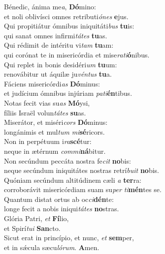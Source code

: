 \evenverse Bénedic, ánima me\textit{a}, \textbf{Dó}mino:~\*\\
\evenverse et noli oblivísci omnes retributi\textit{ó}\textit{nes} \textbf{e}jus.\\
\oddverse Qui propitiátur ómnibus iniquitáti\textit{bus} \textbf{tu}is:~\*\\
\oddverse qui sanat omnes infirmi\textit{tá}\textit{tes} \textbf{tu}as.\\
\evenverse Qui rédimit de intéritu vi\textit{tam} \textbf{tu}am:~\*\\
\evenverse qui corónat te in misericórdia et mise\textit{ra}\textit{ti}\textbf{ó}nibus.\\
\oddverse Qui replet in bonis desidéri\textit{um} \textbf{tu}um:~\*\\
\oddverse renovábitur ut áquilæ ju\textit{vén}\textit{tus} \textbf{tu}a.\\
\evenverse Fáciens misericórdi\textit{as} \textbf{Dó}minus:~\*\\
\evenverse et judícium ómnibus injúriam \textit{pa}\textit{ti}\textbf{én}tibus.\\
\oddverse Notas fecit vias su\textit{as} \textbf{Mó}ysi,~\*\\
\oddverse fíliis Israël volun\textit{tá}\textit{tes} \textbf{su}as.\\
\evenverse Miserátor, et miséri\textit{cors} \textbf{Dó}minus:~\*\\
\evenverse longánimis et mul\textit{tum} \textit{mi}\textbf{sé}ricors.\\
\oddverse Non in perpétuum i\textit{ra}\textbf{scé}tur:~\*\\
\oddverse neque in ætérnum \textit{com}\textit{mi}\textbf{ná}bitur.\\
\evenverse Non secúndum peccáta nostra fe\textit{cit} \textbf{no}bis:~\*\\
\evenverse neque secúndum iniquitátes nostras retrí\textit{bu}\textit{it} \textbf{no}bis.\\
\oddverse Quóniam secúndum altitúdinem cæli \textit{a} \textbf{ter}ra:~\*\\
\oddverse corroborávit misericórdiam suam su\textit{per} \textit{ti}\textbf{mén}tes se.\\
\evenverse Quantum distat ortus ab oc\textit{ci}\textbf{dén}te:~\*\\
\evenverse longe fecit a nobis iniqui\textit{tá}\textit{tes} \textbf{no}stras.\\
\oddverse Glória Patri, \textit{et} \textbf{Fí}lio,~\*\\
\oddverse et Spirí\textit{tu}\textit{i} \textbf{San}cto.\\
\evenverse Sicut erat in princípio, et nunc, \textit{et} \textbf{sem}per,~\*\\
\evenverse et in sǽcula sæcu\textit{ló}\textit{rum}. \textbf{A}men.\\
